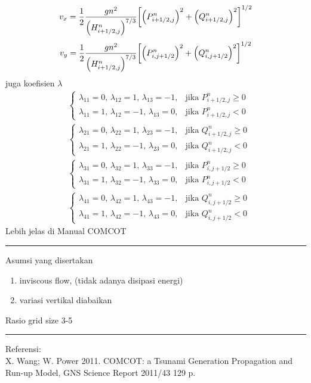 \documentclass{article}
\begin{document}
\[
v_x = \frac{1}{2}\frac{gn^2}{\oio*{H^n_{i+1/2,j}}^{7/3}}
\cic*{\oio*{P^n_{i+1/2,j}}^2+\oio*{Q^n_{i+1/2,j}}^2}^{1/2}
\]
\[
v_y = \frac{1}{2}\frac{gn^2}{\oio*{H^n_{i+1/2,j}}^{7/3}}
\cic*{\oio*{P^n_{i,j+1/2}}^2+\oio*{Q^n_{i,j+1/2}}^2}^{1/2}
\]
juga koefisien $\lambda$
\begin{align*}
    &\begin{cases}
        \lambda_{11}=0,\,\lambda_{12}=1,\,\lambda_{13}=-1,&\text{jika $P^n_{i+1/2,j}\geq 0$}\\
        \lambda_{11}=1,\,\lambda_{12}=-1,\,\lambda_{13}=0,&\text{jika $P^n_{i+1/2,j}< 0$}
    \end{cases}\\
    &\begin{cases}
        \lambda_{21}=0,\,\lambda_{22}=1,\,\lambda_{23}=-1,&\text{jika $Q^n_{i+1/2,j}\geq 0$}\\
        \lambda_{21}=1,\,\lambda_{22}=-1,\,\lambda_{23}=0,&\text{jika $Q^n_{i+1/2,j}< 0$}
    \end{cases}\\
    &\begin{cases}
        \lambda_{31}=0,\,\lambda_{32}=1,\,\lambda_{33}=-1,&\text{jika $P^n_{i,j+1/2}\geq 0$}\\
        \lambda_{31}=1,\,\lambda_{32}=-1,\,\lambda_{33}=0,&\text{jika $P^n_{i,j+1/2}< 0$}
    \end{cases}\\
    &\begin{cases}
        \lambda_{41}=0,\,\lambda_{42}=1,\,\lambda_{43}=-1,&\text{jika $Q^n_{i,j+1/2}\geq 0$}\\
        \lambda_{41}=1,\,\lambda_{42}=-1,\,\lambda_{43}=0,&\text{jika $Q^n_{i,j+1/2}< 0$}
    \end{cases}
\end{align*}
Lebih jelas di Manual COMCOT

\vspace{0.5cm}\hrule height 2pt\vspace{0.5cm}

\noindent Asumsi yang disertakan
\begin{enumerate}
    \item inviscous flow, (tidak adanya disipasi energi)
    \item variasi vertikal diabaikan
\end{enumerate}
Rasio grid size 3-5
\vspace{0.5cm}\hrule height 2pt\vspace{0.5cm}

\noindent Referensi: \\
X. Wang; W. Power 2011. COMCOT: a Tsunami Generation Propagation and
Run-up Model, GNS Science Report 2011/43 129 p.
\end{document}
